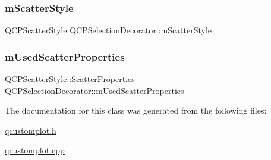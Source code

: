 \subsubsection{\texorpdfstring{m\+Scatter\+Style}{mScatterStyle}}
{\footnotesize\ttfamily \hyperlink{class_q_c_p_scatter_style}{Q\+C\+P\+Scatter\+Style} Q\+C\+P\+Selection\+Decorator\+::m\+Scatter\+Style\hspace{0.3cm}{\ttfamily [protected]}}

\mbox{\label{class_q_c_p_selection_decorator_acb4f6af085283c9ce7d5c168fb53e855}} 
\subsubsection{\texorpdfstring{m\+Used\+Scatter\+Properties}{mUsedScatterProperties}}
{\footnotesize\ttfamily Q\+C\+P\+Scatter\+Style\+::\+Scatter\+Properties Q\+C\+P\+Selection\+Decorator\+::m\+Used\+Scatter\+Properties\hspace{0.3cm}{\ttfamily [protected]}}



The documentation for this class was generated from the following files\+:\begin{DoxyCompactItemize}
\item 
\hyperlink{qcustomplot_8h}{qcustomplot.\+h}\item 
\hyperlink{qcustomplot_8cpp}{qcustomplot.\+cpp}\end{DoxyCompactItemize}
